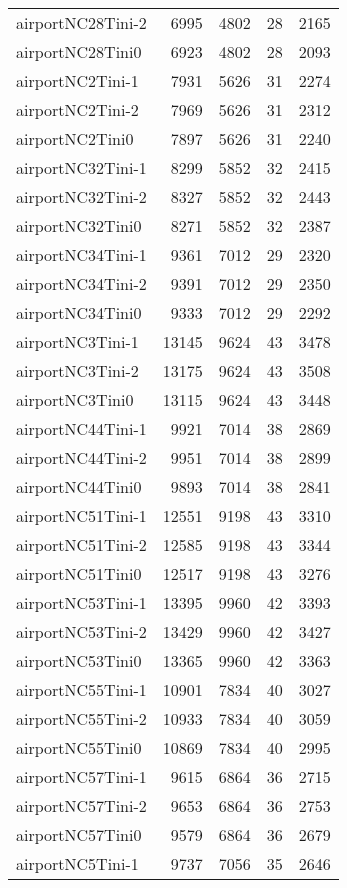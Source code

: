 \begin{longtable}{lrrrr}
airportNC28Tini-2 & 6995 & 4802 & 28 & 2165 \\
airportNC28Tini0 & 6923 & 4802 & 28 & 2093 \\
airportNC2Tini-1 & 7931 & 5626 & 31 & 2274 \\
airportNC2Tini-2 & 7969 & 5626 & 31 & 2312 \\
airportNC2Tini0 & 7897 & 5626 & 31 & 2240 \\
airportNC32Tini-1 & 8299 & 5852 & 32 & 2415 \\
airportNC32Tini-2 & 8327 & 5852 & 32 & 2443 \\
airportNC32Tini0 & 8271 & 5852 & 32 & 2387 \\
airportNC34Tini-1 & 9361 & 7012 & 29 & 2320 \\
airportNC34Tini-2 & 9391 & 7012 & 29 & 2350 \\
airportNC34Tini0 & 9333 & 7012 & 29 & 2292 \\
airportNC3Tini-1 & 13145 & 9624 & 43 & 3478 \\
airportNC3Tini-2 & 13175 & 9624 & 43 & 3508 \\
airportNC3Tini0 & 13115 & 9624 & 43 & 3448 \\
airportNC44Tini-1 & 9921 & 7014 & 38 & 2869 \\
airportNC44Tini-2 & 9951 & 7014 & 38 & 2899 \\
airportNC44Tini0 & 9893 & 7014 & 38 & 2841 \\
airportNC51Tini-1 & 12551 & 9198 & 43 & 3310 \\
airportNC51Tini-2 & 12585 & 9198 & 43 & 3344 \\
airportNC51Tini0 & 12517 & 9198 & 43 & 3276 \\
airportNC53Tini-1 & 13395 & 9960 & 42 & 3393 \\
airportNC53Tini-2 & 13429 & 9960 & 42 & 3427 \\
airportNC53Tini0 & 13365 & 9960 & 42 & 3363 \\
airportNC55Tini-1 & 10901 & 7834 & 40 & 3027 \\
airportNC55Tini-2 & 10933 & 7834 & 40 & 3059 \\
airportNC55Tini0 & 10869 & 7834 & 40 & 2995 \\
airportNC57Tini-1 & 9615 & 6864 & 36 & 2715 \\
airportNC57Tini-2 & 9653 & 6864 & 36 & 2753 \\
airportNC57Tini0 & 9579 & 6864 & 36 & 2679 \\
airportNC5Tini-1 & 9737 & 7056 & 35 & 2646 \\

\end{longtable}
